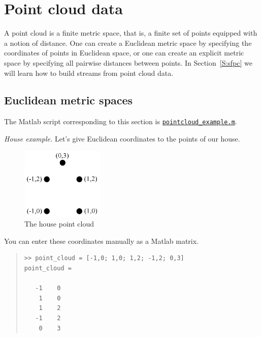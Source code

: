 \documentclass[amscd, amssymb, verbatim]{amsart}[12pt]
\theoremstyle{remark}
\theoremstyle{remark}
\theoremstyle{remark}
\begin{document}
\section{Point cloud data}

A point cloud is a finite metric space, that is, a finite set of points equipped with a notion of distance. One can create a Euclidean metric space by specifying the coordinates of points in Euclidean space, or one can create an explicit metric space by specifying all pairwise distances between points. In Section~\ref{S:sfpc} we will learn how to build streams from point cloud data. 


\subsection{Euclidean metric spaces}\label{SS:euclidean-metric}
The Matlab script corresponding to this section is \href{https://github.com/appliedtopology/javaplex/tree/master/src/matlab/for_distribution/tutorial_examples/pointcloud_example.m}{\texttt{pointcloud\_example.m}}. 

{\em House example.} Let's give Euclidean coordinates to the points of our house.

\vspace{-3mm}
\begin{figure}[htb]
	\centering
	\includegraphics[width=1.55in]{houseCoord.pdf}
	\vspace{-3mm}
	\caption{The house point cloud}
	\label{fig:housePointCloud}
\end{figure}
\FloatBarrier

You can enter these coordinates manually as a Matlab matrix.

\begin{quote} \begin{verbatim}
>> point_cloud = [-1,0; 1,0; 1,2; -1,2; 0,3]
point_cloud =

   -1    0
    1    0
    1    2
   -1    2
    0    3
\end{verbatim} \end{quote}

\end{document}
